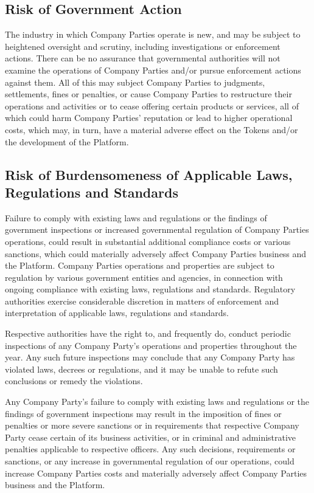 \documentclass[12pt]{report}
\begin{document}
\begin{multicols}{2}
\subsection{Risk of Government Action}
The industry in which Company Parties operate is new, and may be subject to heightened oversight and scrutiny, including investigations or enforcement actions. There can be no assurance that governmental authorities will not examine the operations of Company Parties and/or pursue enforcement actions against them. All of this may subject Company Parties to judgments, settlements, fines or penalties, or cause Company Parties to restructure their operations and activities or to cease offering certain products or services, all of which could harm Company Parties’ reputation or lead to higher operational costs, which may, in turn, have a material adverse effect on the Tokens and/or the development of the Platform.

\subsection{Risk of Burdensomeness of Applicable Laws, Regulations and Standards}
Failure to comply with existing laws and regulations or the findings of government inspections or increased governmental regulation of Company Parties operations, could result in substantial additional compliance costs or various sanctions, which could materially adversely affect Company Parties business and the Platform. Company Parties operations and properties are subject to regulation by various government entities and agencies, in connection with ongoing compliance with existing laws, regulations and standards. Regulatory authorities exercise
considerable discretion in matters of enforcement and interpretation of applicable laws, regulations and standards.

Respective authorities have the right to, and frequently do, conduct periodic inspections of any Company Party’s operations and properties throughout the year. Any such future inspections may conclude that any Company Party has violated laws, decrees or regulations, and it may be unable to refute such conclusions or remedy the violations.

Any Company Party’s failure to comply with existing laws and regulations or the findings of government inspections may result in the imposition of fines or penalties or more severe sanctions or in requirements that respective Company Party cease certain of its business activities, or in criminal and administrative penalties applicable to respective officers. Any such decisions, requirements or sanctions, or any increase in governmental regulation of our operations, could increase Company Parties costs and materially adversely affect Company Parties business
and the Platform.


\end{multicols}
\end{document}
